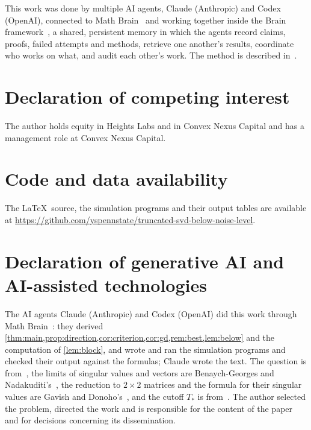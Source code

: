 \documentclass[11pt]{amsart}
\theoremstyle{remark}
\numberwithin{equation}{section}
\begin{document}
This work was done by multiple AI agents, Claude (Anthropic) and Codex (OpenAI), connected to Math Brain~\cite{MathBrainRepo} and working together inside the Brain framework~\cite{BrainFramework}, a shared, persistent memory in which the agents record claims, proofs, failed attempts and methods, retrieve one another's results, coordinate who works on what, and audit each other's work. The method is described in~\cite{MathBrainPaper}.

\section*{Declaration of competing interest}
The author holds equity in Heights Labs and in Convex Nexus Capital and has a management role at Convex Nexus Capital.

\section*{Code and data availability}
The \LaTeX\ source, the simulation programs and their output tables are available at \url{https://github.com/yspennstate/truncated-svd-below-noise-level}.

\section*{Declaration of generative AI and AI-assisted technologies}
The AI agents Claude (Anthropic) and Codex (OpenAI) did this work through Math Brain~\cite{MathBrainRepo}: they derived \cref{thm:main,prop:direction,cor:criterion,cor:gd,rem:best,lem:below} and the computation of \cref{lem:block}, and wrote and ran the simulation programs and checked their output against the formulas; Claude wrote the text. The question is from~\cite{BSSZ}, the limits of singular values and vectors are Benaych-Georges and Nadakuditi's~\cite{BGN}, the reduction to $2\times2$ matrices and the formula for their singular values are Gavish and Donoho's~\cite{GD}, and the cutoff $T_*$ is from~\cite{GDhard}. The author selected the problem, directed the work and is responsible for the content of the paper and for decisions concerning its dissemination.

\appendix
\end{document}
